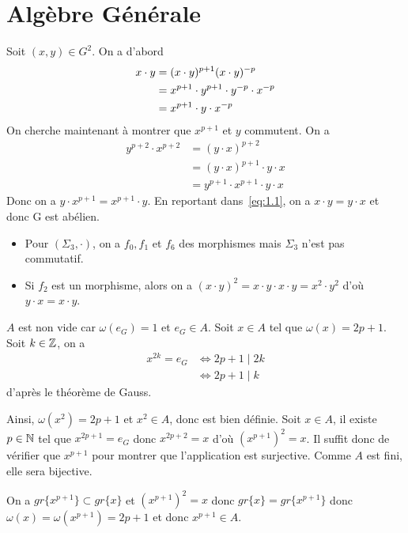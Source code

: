 \section{Algèbre Générale}

\begin{solution}
	Soit $(x,y)\in G^{2}$. On a d'abord
	\begin{align}
		x\cdot y
		&=(x\cdot y)^{p+1}(x\cdot y)^{-p} \notag \\
		&=x^{p+1}\cdot y^{p+1}\cdot y^{-p}\cdot x^{-p}\notag \\
		&=x^{p+1}\cdot y \cdot x^{-p} \label{eq:1.1}
	\end{align}
	On cherche maintenant à montrer que $x^{p+1}$ et $y$ commutent.
	On a
	\begin{align*}
		y^{p+2}\cdot x^{p+2}
		&=(y\cdot x)^{p+2}\\
		&=(y\cdot x)^{p+1}\cdot y\cdot x\\
		&=y^{p+1}\cdot x^{p+1}\cdot y\cdot x
	\end{align*}
	Donc on a $y\cdot x^{p+1}=x^{p+1}\cdot y$. En reportant dans~\eqref{eq:1.1}, on a $x\cdot y=y\cdot x$ et donc G est abélien.
\end{solution}

\begin{remark}
	\phantom{}
	\begin{itemize}
		\item Pour $(\Sigma_{3},\cdot)$, on a $f_{0},f_{1}$ et $f_{6}$ des morphismes mais $\Sigma_{3}$ n'est pas commutatif.
		\item Si $f_{2}$ est un morphisme, alors on a $(x\cdot y)^{2}=x\cdot y\cdot x\cdot y=x^{2}\cdot y^{2}$ d'où $y\cdot x=x\cdot y$.
	\end{itemize}
\end{remark}

\begin{solution}
	$A$ est non vide car $\omega(e_{G})=1$ et $e_{G}\in A$. Soit $x\in A$ tel que $\omega(x)=2p+1$. Soit $k\in\mathbb{Z}$, on a 
	\begin{align*}
		x^{2k}=e_{G}
		&\Leftrightarrow 2p+1\mid 2k\\
		&\Leftrightarrow 2p+1\mid k
	\end{align*}
	d'après le théorème de Gauss.

	Ainsi, $\omega(x^{2})=2p+1$ et $x^{2}\in A$, donc  est bien définie. Soit $x\in A$, il existe $p\in\mathbb{N}$ tel que $x^{2p+1}=e_{G}$ donc $x^{2p+2}=x$ d'où $(x^{p+1})^{2}=x$. Il suffit donc de vérifier que $x^{p+1}$ pour montrer que l'application est surjective. Comme $A$ est fini, elle sera bijective.

	On a $gr\{x^{p+1}\}\subset gr\{x\}$ et $(x^{p+1})^{2}=x$ donc $gr\{x\}=gr\{x^{p+1}\}$ donc $\omega(x)=\omega(x^{p+1})=2p+1$ et donc $x^{p+1}\in A$.
\end{solution}

